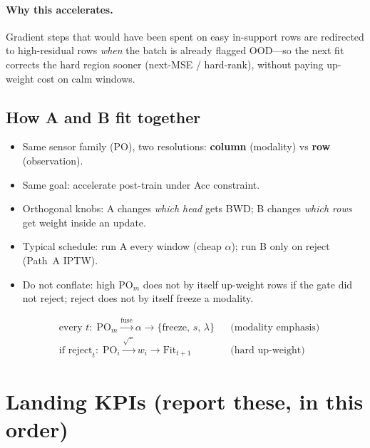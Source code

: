 \documentclass[11pt]{article}
\newcommand{\PO}{\mathrm{PO}}
\begin{document}
\paragraph{Why this accelerates.}
Gradient steps that would have been spent on easy in-support rows are
redirected to high-residual rows \emph{when} the batch is already
flagged OOD---so the next fit corrects the hard region sooner
(next-MSE / hard-rank), without paying up-weight cost on calm windows.

\subsection{How A and B fit together}
\label{sec:logicAB}

\begin{itemize}[leftmargin=1.2em,itemsep=2pt]
  \item Same sensor family ($\PO$), two resolutions:
        \textbf{column} (modality) vs \textbf{row} (observation).
  \item Same goal: accelerate post-train under Acc constraint.
  \item Orthogonal knobs: A changes \emph{which head} gets BWD;
        B changes \emph{which rows} get weight inside an update.
  \item Typical schedule: run A every window (cheap $\alpha$);
        run B only on reject (Path~A IPTW).
  \item Do not conflate: high $\PO_m$ does not by itself up-weight rows
        if the gate did not reject; reject does not by itself freeze
        a modality.
\end{itemize}

\[
\boxed{
\begin{aligned}
&\text{every }t:\;
  \PO_m \xrightarrow{\mathrm{fuse}} \alpha
  \xrightarrow{} \{\mathrm{freeze},\,s,\,\lambda\}
  &&\text{(modality emphasis)}\\
&\text{if reject}_t:\;
  \PO_i \xrightarrow{\sqrt{\,\cdot\,}} w_i
  \xrightarrow{} \mathrm{Fit}_{t+1}
  &&\text{(hard up-weight)}
\end{aligned}
}
\]

\section{Landing KPIs (report these, in this order)}
\label{sec:kpi}
\end{document}
